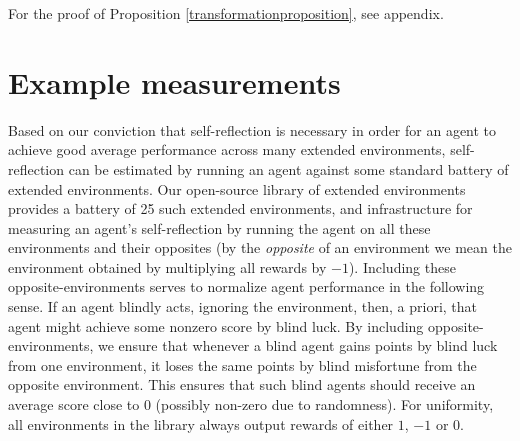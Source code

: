 \documentclass{article}
\begin{document}
For the proof of Proposition \ref{transformationproposition}, see appendix.


\section{Example measurements}
\label{measurementssection}

Based on our conviction that self-reflection is necessary in order for an agent to
achieve good average performance across many extended environments, self-reflection can
be estimated by running an agent against some standard battery of extended environments.
Our open-source library of extended environments \cite{library} provides a battery of
25 such extended environments, and infrastructure for measuring an agent's self-reflection
by running the agent on all these environments and their opposites
(by the \emph{opposite} of an environment we mean the environment
obtained by multiplying
all rewards by $-1$). Including these opposite-environments serves to normalize
agent performance in the following sense. If an agent blindly acts, ignoring the environment,
then, a priori, that agent might achieve some nonzero score by blind luck. By including
opposite-environments, we ensure that whenever a blind agent gains points by blind luck
from one environment, it loses the same points by blind misfortune from the opposite
environment. This ensures that such blind agents should receive an average score close to
$0$ (possibly non-zero due to randomness). For uniformity, all environments in the library
always output rewards of either $1$, $-1$ or $0$.
\end{document}
